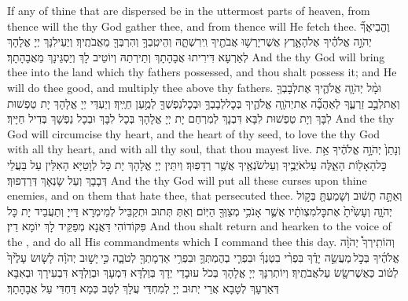 {If any of thine that are dispersed be in the uttermost parts of heaven, from thence will the \lord\space thy God gather thee, and from thence will He fetch thee.}{}
{וֶהֱבִיאֲךָ֞ יְהֹוָ֣ה אֱלֹהֶ֗יךָ אֶל\maqqaf הָאָ֛רֶץ אֲשֶׁר\maqqaf יָרְשׁ֥וּ אֲבֹתֶ֖יךָ וִֽירִשְׁתָּ֑הּ וְהֵיטִֽבְךָ֥ וְהִרְבְּךָ֖ מֵאֲבֹתֶֽיךָ׃}
{וְיַעֵילִנָּךְ יְיָ אֱלָהָךְ לְאַרְעָא דִּירִיתוּ אֲבָהָתָךְ וְתֵירְתַהּ וְיוֹטֵיב לָךְ וְיַסְגֵּינָךְ מֵאֲבָהָתָךְ׃}
{And the \lord\space thy God will bring thee into the land which thy fathers possessed, and thou shalt possess it; and He will do thee good, and multiply thee above thy fathers.}{}
{וּמָ֨ל יְהֹוָ֧ה אֱלֹהֶ֛יךָ אֶת\maqqaf לְבָבְךָ֖ וְאֶת\maqqaf לְבַ֣ב זַרְעֶ֑ךָ לְאַהֲבָ֞ה אֶת\maqqaf יְהֹוָ֧ה אֱלֹהֶ֛יךָ בְּכׇל\maqqaf לְבָבְךָ֥ וּבְכׇל\maqqaf נַפְשְׁךָ֖ לְמַ֥עַן חַיֶּֽיךָ׃}
{וְיַעְדֵּי יְיָ אֱלָהָךְ יָת טַפְשׁוּת לִבָּךְ וְיָת טַפְשׁוּת לִבָּא דִּבְנָךְ לְמִרְחַם יָת יְיָ אֱלָהָךְ בְּכָל לִבָּךְ וּבְכָל נַפְשָׁךְ בְּדִיל חַיָּיךְ׃}
{And the \lord\space thy God will circumcise thy heart, and the heart of thy seed, to love the \lord\space thy God with all thy heart, and with all thy soul, that thou mayest live.}{}
{וְנָתַן֙ יְהֹוָ֣ה אֱלֹהֶ֔יךָ אֵ֥ת כׇּל\maqqaf הָאָל֖וֹת הָאֵ֑לֶּה עַל\maqqaf אֹיְבֶ֥יךָ וְעַל\maqqaf שֹׂנְאֶ֖יךָ אֲשֶׁ֥ר רְדָפֽוּךָ׃}
{וְיִתֵּין יְיָ אֱלָהָךְ יָת כָּל לְוָטַיָּא הָאִלֵּין עַל בַּעֲלֵי דְּבָבָךְ וְעַל שָׂנְאָךְ דְּרַדְפוּךְ׃}
{And the \lord\space thy God will put all these curses upon thine enemies, and on them that hate thee, that persecuted thee.}{}
{וְאַתָּ֣ה תָשׁ֔וּב וְשָׁמַעְתָּ֖ בְּק֣וֹל יְהֹוָ֑ה וְעָשִׂ֙יתָ֙ אֶת\maqqaf כׇּל\maqqaf מִצְוֺתָ֔יו אֲשֶׁ֛ר אָנֹכִ֥י מְצַוְּךָ֖ הַיּֽוֹם׃}
{וְאַתְּ תְּתוּב וּתְקַבֵּיל לְמֵימְרָא דַּייָ וְתַעֲבֵיד יָת כָּל פִּקּוֹדוֹהִי דַּאֲנָא מְפַקֵּיד לָךְ יוֹמָא דֵין׃}
{And thou shalt return and hearken to the voice of the \lord, and do all His commandments which I command thee this day.}{}
{וְהוֹתִֽירְךָ֩ יְהֹוָ֨ה אֱלֹהֶ֜יךָ בְּכֹ֣ל \legarmeh  מַעֲשֵׂ֣ה יָדֶ֗ךָ בִּפְרִ֨י בִטְנְךָ֜ וּבִפְרִ֧י בְהֶמְתְּךָ֛ וּבִפְרִ֥י אַדְמָתְךָ֖ לְטֹבָ֑ה כִּ֣י \legarmeh  יָשׁ֣וּב יְהֹוָ֗ה לָשׂ֤וּשׂ עָלֶ֙יךָ֙ לְט֔וֹב כַּאֲשֶׁר\maqqaf שָׂ֖שׂ עַל\maqqaf אֲבֹתֶֽיךָ׃}
{וְיוֹתְרִנָּךְ יְיָ אֱלָהָךְ בְּכֹל עוּבָדֵי יְדָךְ בְּוַלְדָּא דִּמְעָךְ וּבְוַלְדָּא דִּבְעִירָךְ וּבְאִבָּא דְּאַרְעָךְ לְטָבָא אֲרֵי יְתוּב יְיָ לְמִחְדֵּי עֲלָךְ לְטָב כְּמָא דַּחְדִּי עַל אֲבָהָתָךְ׃}

